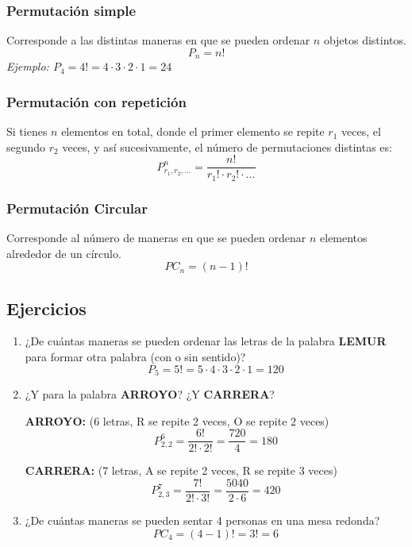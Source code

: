 \documentclass[12pt, letterpaper]{article}
\begin{document}
\subsubsection{Permutación simple} Corresponde a las distintas maneras en que se pueden ordenar $n$ objetos distintos.
\[ P_n = n! \]
\textit{Ejemplo: $P_4 = 4! = 4 \cdot 3 \cdot 2 \cdot 1 = 24$}

\subsubsection{Permutación con repetición} Si tienes $n$ elementos en total, donde el primer elemento se repite $r_1$ veces, el segundo $r_2$ veces, y así sucesivamente, el número de permutaciones distintas es:
\[ P_{r_1, r_2, \dots}^n = \frac{n!}{r_1! \cdot r_2! \cdot \dots} \]

\subsubsection{Permutación Circular} Corresponde al número de maneras en que se pueden ordenar $n$ elementos alrededor de un círculo.
\[ PC_n = (n-1)! \]

\subsection{Ejercicios}
\begin{enumerate}[label=\alph*.)]
	\item ¿De cuántas maneras se pueden ordenar las letras de la palabra \textbf{LEMUR} para formar otra palabra (con o sin sentido)?
	      \[ P_5 = 5! = 5 \cdot 4 \cdot 3 \cdot 2 \cdot 1 = 120 \]

	\item ¿Y para la palabra \textbf{ARROYO}? ¿Y \textbf{CARRERA}? \\
	      \begin{minipage}[t]{0.45\textwidth}
		      \centering
		      \textbf{ARROYO:} (6 letras, R se repite 2 veces, O se repite 2 veces)
		      \[ P_{2, 2}^6 = \frac{6!}{2! \cdot 2!} = \frac{720}{4} = 180 \]
	      \end{minipage}
	      \hfill
	      \begin{minipage}[t]{0.45\textwidth}
		      \centering
		      \textbf{CARRERA:} (7 letras, A se repite 2 veces, R se repite 3 veces)
		      \[ P_{2,3}^7 = \frac{7!}{2! \cdot 3!} = \frac{5040}{2 \cdot 6} = 420 \]
	      \end{minipage}

	      \vspace{1cm} %

	\item ¿De cuántas maneras se pueden sentar 4 personas en una mesa redonda?
	      \[ PC_4 = (4-1)! = 3! = 6 \]
\end{enumerate}
\newpage
\end{document}
